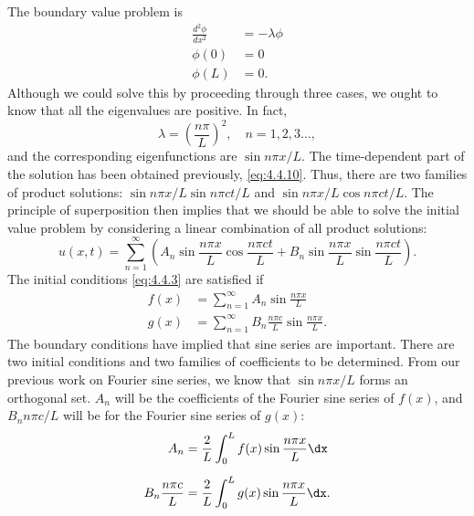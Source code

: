 The boundary value problem is
\begin{align*}
\frac{d^2\phi}{dx^2} &= -\lambda\phi \\
\phi(0) &= 0 \\
\phi(L) &= 0.
\end{align*}
Although we could solve this by proceeding through three cases, we ought to know that all the eigenvalues are positive.  In fact,
\[
\lambda = \left(\frac{n\pi}{L}\right)^2, \quad n = 1, 2, 3\ldots,
\]
and the corresponding eigenfunctions are $\sin n\pi x/L$.  The time-dependent part of the solution has been obtained previously, \eqref{eq:4.4.10}.  Thus, there are two families of product solutions: $\sin n\pi x/L\sin n\pi ct/L$ and $\sin n\pi x/L\cos n\pi ct/L$.  The principle of superposition then implies that we should be able to solve the initial value problem by considering a linear combination of all product solutions:
\begin{equation}
u(x,t) = \sum_{n=1}^{\infty}\left(A_n\sin\frac{n\pi x}{L}\cos\frac{n\pi ct}{L} + B_n\sin\frac{n\pi x}{L}\sin\frac{n\pi ct}{L}\right).
\label{eq:4.4.11}
\end{equation}
The initial conditions \eqref{eq:4.4.3} are satisfied if
\begin{equation}
\begin{aligned}
f(x) &= \sum_{n=1}^{\infty} A_n\sin\frac{n\pi x}{L} \\[6pt]
g(x) &= \sum_{n=1}^{\infty} B_n\frac{n\pi c}{L}\sin\frac{n\pi x}{L}.
\end{aligned}
\label{eq:4.4.12}
\end{equation}
The boundary conditions have implied that sine series are important.  There are two initial conditions and two families of coefficients to be determined.  From our previous work on Fourier sine series, we know that $\sin n\pi x/L$ forms an orthogonal set.  $A_n$ will be the coefficients of the Fourier sine series of $f(x)$, and $B_n n\pi c/L$ will be for the Fourier sine series of $g(x)$:
\begin{equation}
\begin{aligned}
A_n &= \frac{2}{L}\int_0^L f(x)\sin\frac{n\pi x}{L}\dx \\[6pt]
B_n\frac{n\pi c}{L} &= \frac{2}{L}\int_0^L g(x)\sin\frac{n\pi x}{L}\dx.
\end{aligned}
\label{eq:4.4.13}
\end{equation}

